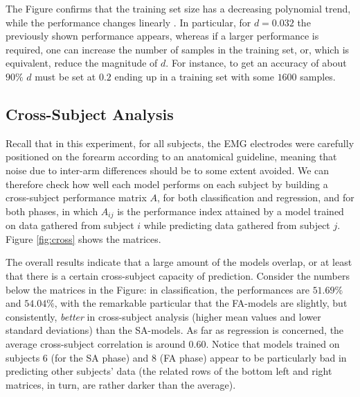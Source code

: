 \documentclass[10pt]{bmc_article}
\def\texttt{[image: ]}
\newenvironment{bmcformat}
  {\begin{raggedright}\baselineskip20pt\sloppy\setboolean{publ}{false}}
  {\end{raggedright}\baselineskip20pt\sloppy}
\begin{document}
\begin{bmcformat}
The Figure confirms that the training set size has a decreasing
polynomial trend, while the performance changes linearly
\cite{2008.BioCyb}. In
particular, for $d=0.032$ the previously shown performance appears,
whereas if a larger performance is required, one can increase the
number of samples in the training set, or, which is equivalent, reduce
the magnitude of $d$. For instance, to get an accuracy of about $90\%$
$d$ must be set at $0.2$ ending up in a training set with some $1600$
samples.

\subsection*{Cross-Subject Analysis}

Recall that in this experiment, for all subjects, the EMG electrodes
were carefully positioned on the forearm according to an anatomical
guideline, meaning that noise due to inter-arm differences should be
to some extent avoided. We can therefore check how well each model
performs on each subject by building a cross-subject performance
matrix $A$, for both classification and regression, and for both phases,
in which $A_{ij}$ is the performance index attained by a model trained
on data gathered from subject $i$ while predicting data gathered from
subject $j$.  Figure \ref{fig:cross} shows the matrices.


The overall results indicate that a large amount of the models
overlap, or at least that there is a certain cross-subject capacity of
prediction. Consider the numbers below the matrices in the Figure: in
classification, the performances are $51.69\%$ and $54.04\%$, with the
remarkable particular that the FA-models are slightly, but
consistently, \emph{better} in cross-subject analysis (higher mean
values and lower standard deviations) than the SA-models. As far as
regression is concerned, the average cross-subject correlation is
around $0.60$. Notice that models trained
on subjects $6$ (for the SA phase) and $8$ (FA phase) appear to be
particularly bad in predicting other subjects' data (the related rows
of the bottom left and right matrices, in turn, are rather darker than
the average).


\end{bmcformat}
\end{document}

